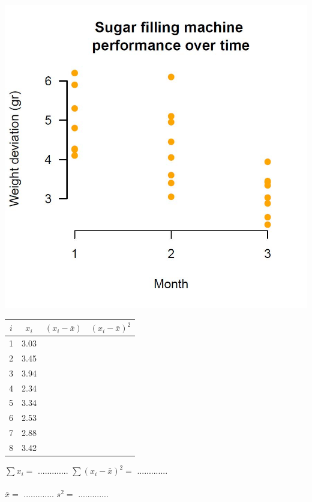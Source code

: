 \begin{minipage}[t]{0.5\textwidth}
\includegraphics[width=\textwidth]{Files/Images/homogeneityOfVariances.jpg}
\end{minipage}%
\begin{minipage}[t]{0.5\textwidth}
\vspace*{-7cm}
\begin{center}
    \begin{tabular}{|c|c|c|c|}
    \hline 
    $i$ & $x_i$ & $(x_i - \bar{x})$ & $(x_i - \bar{x})^2$ \tstrut\bstrut\\
    \hline
    1 & 3.03 & & \tstrut\bstrut\\
    \hline
    2 & 3.45 & & \tstrut\bstrut\\
    \hline
    3 & 3.94 & & \tstrut\bstrut\\
    \hline
    4 & 2.34 & & \tstrut\bstrut\\
    \hline
    5 & 3.34 & & \tstrut\bstrut\\
    \hline
    6 & 2.53 & & \tstrut\bstrut\\
    \hline
    7 & 2.88 & & \tstrut\bstrut\\
    \hline
    8 & 3.42 & & \tstrut\bstrut\\
    \hline
    \end{tabular}
    \end{center}
    
    $\sum x_i = $  ............. \hspace*{.4cm} $\sum (x_i - \bar{x})^2 = $  ............. \\
    \\
    \hspace*{10pt} $\bar{x} = $ ............. \hspace*{2cm} $s^2 = $  ............. \\
\end{minipage}%

